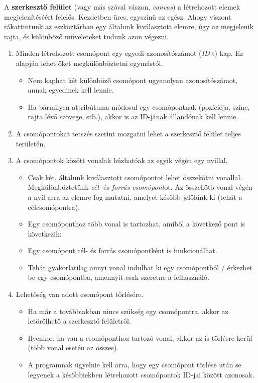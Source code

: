 A \textbf{szerkesztő felület} (vagy más szóval vászon, \textit{canvas}) a létrehozott elemek megjelenítéséért felelős. Kezdetben üres, egyszínű az egész. Ahogy viszont rákattintunk az eszköztárban egy általunk kiválasztott elemre, úgy az megjelenik rajta, és különböző műveleteket tudunk azon végezni.

\begin{enumerate}
\item Minden létrehozott csomópont egy egyedi azonosítószámot (\textit{ID}-t) kap. Ez alapján lehet őket megkülönböztetni egymástól.

\begin{itemize}
\item Nem kaphat két különböző csomópont ugyanolyan azonosítószámot, annak egyedinek kell lennie.
\item Ha bármilyen attribútuma módosul egy csomópontnak (pozíciója, színe, rajta lévő szövege, stb.), akkor is az ID-jának állandónak kell lennie.
\end{itemize}

\item A csomópontokat tetszés szerint mozgatni lehet a szerkesztő felület teljes területén.

\item A csomópontok között vonalak húzhatóak az egyik végén egy nyíllal.

\begin{itemize}
\item Csak két, általunk kiválasztott csomópontot lehet összekötni vonallal. Megkülönböztetünk \textit{cél}- és \textit{forrás csomópont}ot. Az összekötő vonal végén a nyíl arra az elemre fog mutatni, amelyet később jelölünk ki (tehát a célcsomópontra).
\item Egy csomóponthoz több vonal is tartozhat, amiből a következő pont is következik:
\item Egy csomópont cél- és forrás csomópontként is funkcionálhat.
\item Tehát gyakorlatilag annyi vonal indulhat ki egy csomópontból / érkezhet be egy csomópontba, amennyit csak szeretne a felhasználó.
\end{itemize}

\item Lehetőség van adott csomópont törlésére.

\begin{itemize}
\item Ha már a továbbiakban nincs szükség egy csomópontra, akkor az letörölhető a szerkesztő felületről.
\item Ilyenkor, ha van a csomóponthoz tartozó vonal, akkor az is törlésre kerül (több vonal esetén az összes).
\item A programnak ügyelnie kell arra, hogy egy csomópont törlése után se legyenek a későbbiekben létrehozott csomópontok ID-jai között azonosak.
\end{itemize}


\end{enumerate}
